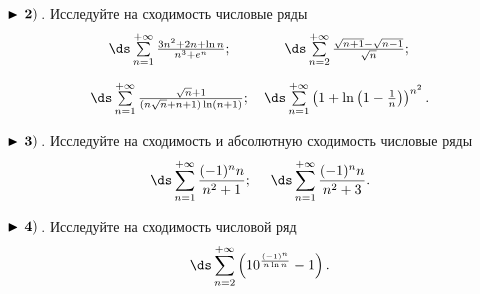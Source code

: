 $\bf\blacktriangleright\,2)\,$. Исследуйте на сходимость числовые ряды
\begin{equation*}
    \begin{array}{ccc}
        \,
\ds\sum\limits_{n=1}^{+\infty}\frac{3n^2+2n+\ln n}{n^3+e^n}

        ; &   \,
\ds\sum\limits_{n=2}^{+\infty}\frac{\sqrt{n+1}-\sqrt{n-1}}{\sqrt{n}}

        ; \\[6mm]
        \,
\ds\sum\limits_{n=1}^{+\infty}\frac{\sqrt{n}+1}{(n\sqrt{n}+n+1)\ln (n+1)}

        ; &    \,
\ds\sum\limits_{n=1}^{+\infty}\left(1+\ln\left(1-\frac{1}{n}\right)\right)^{n^2}
        .
    \end{array}
\end{equation*}


$\bf\blacktriangleright\,3)\,$. Исследуйте на сходимость и абсолютную сходимость числовые ряды
\begin{equation*}
    \,\ds\sum\limits_{n=1}^{+\infty}\frac{(-1)^n n}{n^2+1}

    ;\quad\,   \,
\ds\sum\limits_{n=1}^{+\infty}\frac{(-1)^n n}{n^2+3}
    .
\end{equation*}


$\bf\blacktriangleright\,4)\,$. Исследуйте на сходимость числовой ряд
\begin{equation*}
    \,
\ds\sum\limits_{n=2}^{+\infty}\left(10^{\frac{(-1)^n}{n\ln n}}-1\right)
    .
\end{equation*}
